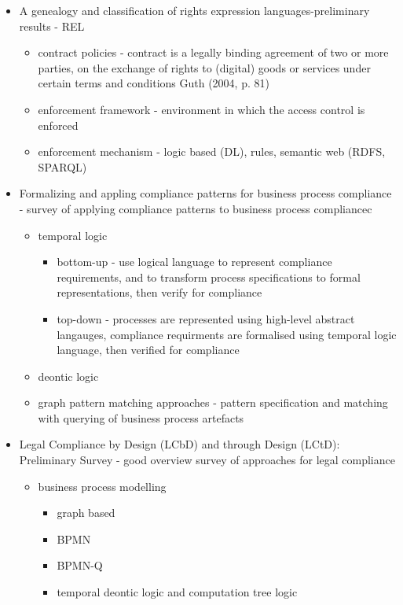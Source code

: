 \begin{itemize}


\item A genealogy and classification of rights expression languages-preliminary results - REL
	\begin{itemize}
	\item contract policies -  contract is a legally binding agreement of two or more parties, on the exchange of rights to (digital) goods or services under certain terms and conditions Guth (2004, p. 81)
	\item enforcement framework - environment in which the access control is enforced
	\item enforcement mechanism - logic based (DL), rules, semantic web (RDFS, SPARQL)
	\end{itemize}
\item Formalizing and appling compliance patterns for business process compliance - survey of applying compliance patterns to business process compliancec
	\begin{itemize}
	\item temporal logic
		\begin{itemize}
		\item bottom-up - use logical language to represent compliance requirements, and to transform process specifications to formal representations, then verify for compliance
		\item top-down - processes are represented using high-level abstract langauges, compliance requirments are formalised using temporal logic language, then verified for compliance
		\end{itemize}
	\item deontic logic 
	\item graph pattern matching approaches - pattern specification and matching with querying of business process artefacts
	\end{itemize}
\item Legal Compliance by Design (LCbD) and through Design (LCtD): Preliminary Survey - good overview survey of approaches for legal compliance
	\begin{itemize}
	\item business process modelling
		\begin{itemize}
		\item graph based 
		\item BPMN
		\item BPMN-Q
		\item temporal deontic logic and computation tree logic

\end{itemize}
\end{itemize}
\end{itemize}

